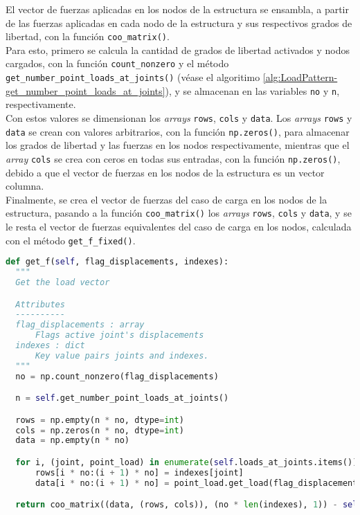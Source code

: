 El vector de fuerzas aplicadas en los nodos de la estructura se ensambla, a partir de las fuerzas aplicadas en cada nodo de la estructura y sus respectivos grados de libertad, con la función \verb|coo_matrix()|.\\

Para esto, primero se calcula la cantidad de grados de libertad activados y nodos cargados, con la función \verb|count_nonzero| y el método \verb|get_number_point_loads_at_joints()| (véase el algoritimo \ref{alg:LoadPattern-get_number_point_loads_at_joints}), y se almacenan en las variables \verb|no| y \verb|n|, respectivamente.\\

Con estos valores se dimensionan los \emph{arrays} \verb|rows|, \verb|cols| y \verb|data|. Los \emph{arrays} \verb|rows| y \verb|data| se crean con valores arbitrarios, con la función \verb|np.zeros()|, para almacenar los grados de libertad y las fuerzas en los nodos respectivamente, mientras que el \emph{array} \verb|cols| se crea con ceros en todas sus entradas, con la función \verb|np.zeros()|, debido a que el vector de fuerzas en los nodos de la estructura es un vector columna.\\

Finalmente, se crea el vector de fuerzas del caso de carga en los nodos de la estructura, pasando a la función \verb|coo_matrix()| los \emph{arrays} \verb|rows|, \verb|cols| y \verb|data|, y se le resta el vector de fuerzas equivalentes del caso de carga en los nodos, calculada con el método \verb|get_f_fixed()|.\\

\begin{lstlisting}[language=Python,caption=Método \texttt{get\_f()} de la clase \texttt{LoadPattern}.,label=alg:LoadPattern-get_f, frame=single]
def get_f(self, flag_displacements, indexes):
  """
  Get the load vector

  Attributes
  ----------
  flag_displacements : array
      Flags active joint's displacements
  indexes : dict
      Key value pairs joints and indexes.
  """
  no = np.count_nonzero(flag_displacements)

  n = self.get_number_point_loads_at_joints()

  rows = np.empty(n * no, dtype=int)
  cols = np.zeros(n * no, dtype=int)
  data = np.empty(n * no)

  for i, (joint, point_load) in enumerate(self.loads_at_joints.items()):
      rows[i * no:(i + 1) * no] = indexes[joint]
      data[i * no:(i + 1) * no] = point_load.get_load(flag_displacements)

  return coo_matrix((data, (rows, cols)), (no * len(indexes), 1)) - self.get_f_fixed(flag_displacements, indexes)
\end{lstlisting}

